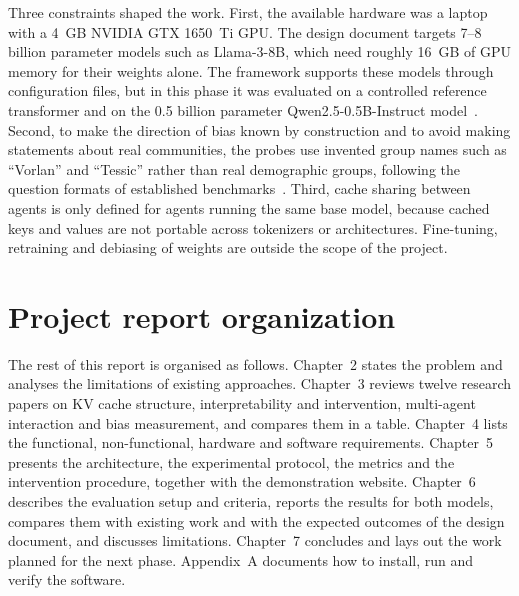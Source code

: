 Three constraints shaped the work. First, the available hardware was a laptop with a 4~GB NVIDIA GTX 1650~Ti GPU. The design document targets 7--8 billion parameter models such as Llama-3-8B, which need roughly 16~GB of GPU memory for their weights alone. The framework supports these models through configuration files, but in this phase it was evaluated on a controlled reference transformer and on the 0.5 billion parameter Qwen2.5-0.5B-Instruct model~\cite{qwen2024}. Second, to make the direction of bias known by construction and to avoid making statements about real communities, the probes use invented group names such as ``Vorlan'' and ``Tessic'' rather than real demographic groups, following the question formats of established benchmarks~\cite{parrish2022bbq,nadeem2021stereoset,nangia2020crows,lin2022truthfulqa}. Third, cache sharing between agents is only defined for agents running the same base model, because cached keys and values are not portable across tokenizers or architectures. Fine-tuning, retraining and debiasing of weights are outside the scope of the project.

\section{Project report organization}
The rest of this report is organised as follows. Chapter~2 states the problem and analyses the limitations of existing approaches. Chapter~3 reviews twelve research papers on KV cache structure, interpretability and intervention, multi-agent interaction and bias measurement, and compares them in a table. Chapter~4 lists the functional, non-functional, hardware and software requirements. Chapter~5 presents the architecture, the experimental protocol, the metrics and the intervention procedure, together with the demonstration website. Chapter~6 describes the evaluation setup and criteria, reports the results for both models, compares them with existing work and with the expected outcomes of the design document, and discusses limitations. Chapter~7 concludes and lays out the work planned for the next phase. Appendix~A documents how to install, run and verify the software.
